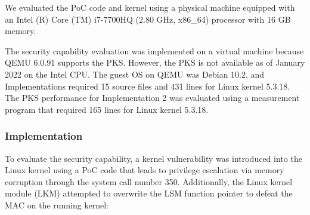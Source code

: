 %
We evaluated the PoC code and kernel using a physical machine equipped with an
Intel (R) Core (TM) i7-7700HQ (2.80 GHz, x86\_64) processor with 16 GB memory.
%
%

The security capability evaluation was implemented on a virtual machine because
QEMU 6.0.91 supports the PKS. However, the PKS is not available as of January
2022 on the Intel CPU.
%
The guest OS on QEMU was Debian 10.2, and Implementations required 15 source
files and 431 lines for Linux kernel 5.3.18.
%
The PKS performance for Implementation 2 was evaluated using a
measurement program that required 165 lines for Linux kernel 5.3.18.



\subsubsection{Implementation}
%
%
To evaluate the security capability, a kernel vulnerability was introduced into
the Linux kernel using a PoC code \cite{CVE-2017-16995} that leads to privilege
escalation via memory corruption through the system call number 350.
%
Additionally, the Linux kernel module (LKM) attempted to overwrite the LSM function pointer to
defeat the MAC on the running kernel:

